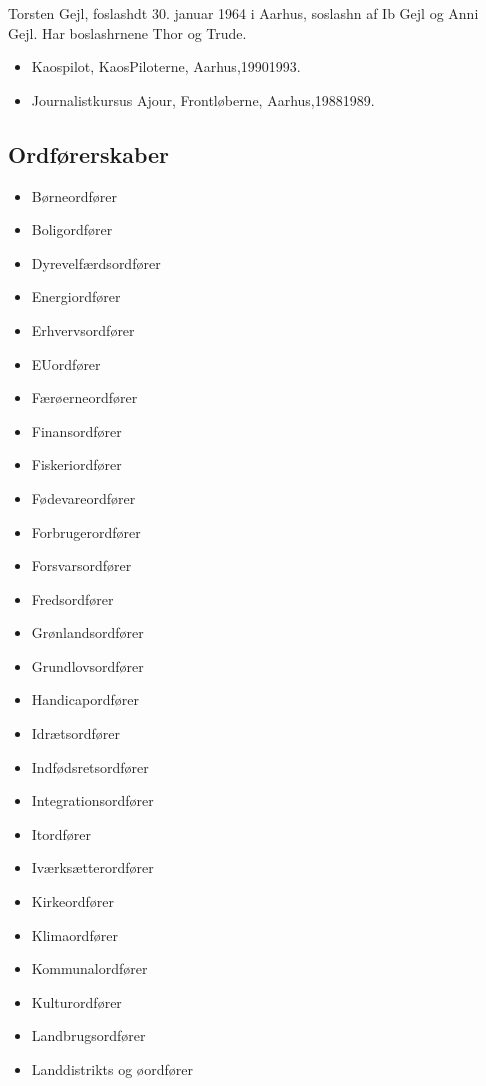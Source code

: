 \documentclass[11pt, a4paper]{awesome-cv}
\begin{document}
\makecvheader[R]
\makelettertitle
\begin{cvletter}
Torsten Gejl, foslashdt 30. januar 1964 i Aarhus, soslashn af Ib Gejl og Anni Gejl. Har boslashrnene Thor og Trude.

\begin{itemize}
\item Kaospilot, KaosPiloterne, Aarhus,19901993.
\item Journalistkursus Ajour, Frontløberne, Aarhus,19881989.
\end{itemize}
\subsection*{Ordførerskaber}
\begin{itemize}
\item Børneordfører
\item Boligordfører
\item Dyrevelfærdsordfører
\item Energiordfører
\item Erhvervsordfører
\item EUordfører
\item Færøerneordfører
\item Finansordfører
\item Fiskeriordfører
\item Fødevareordfører
\item Forbrugerordfører
\item Forsvarsordfører
\item Fredsordfører
\item Grønlandsordfører
\item Grundlovsordfører
\item Handicapordfører
\item Idrætsordfører
\item Indfødsretsordfører
\item Integrationsordfører
\item Itordfører
\item Iværksætterordfører
\item Kirkeordfører
\item Klimaordfører
\item Kommunalordfører
\item Kulturordfører
\item Landbrugsordfører
\item Landdistrikts og øordfører

\end{itemize}
\end{cvletter}
\end{document}

